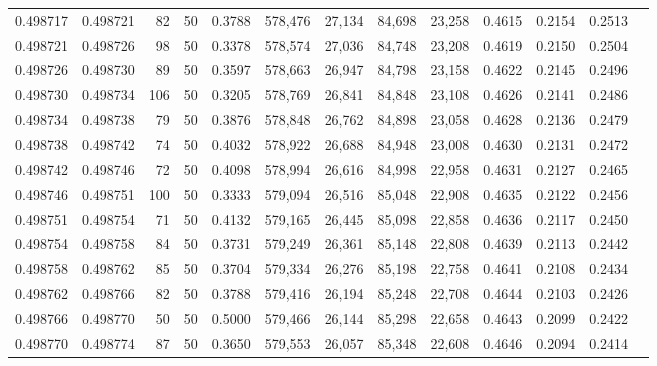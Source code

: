 \begin{tabular}{rrrrrrrrrrrrr}
0.498717 & 0.498721 &    82 &  50 &                                     0.3788 & 578,476 &  27,134 &  84,698 &  23,258 & 0.4615 & 0.2154 & 0.2513 \\
0.498721 & 0.498726 &    98 &  50 &                                     0.3378 & 578,574 &  27,036 &  84,748 &  23,208 & 0.4619 & 0.2150 & 0.2504 \\
0.498726 & 0.498730 &    89 &  50 &                                     0.3597 & 578,663 &  26,947 &  84,798 &  23,158 & 0.4622 & 0.2145 & 0.2496 \\
0.498730 & 0.498734 &   106 &  50 &                                     0.3205 & 578,769 &  26,841 &  84,848 &  23,108 & 0.4626 & 0.2141 & 0.2486 \\
0.498734 & 0.498738 &    79 &  50 &                                     0.3876 & 578,848 &  26,762 &  84,898 &  23,058 & 0.4628 & 0.2136 & 0.2479 \\
0.498738 & 0.498742 &    74 &  50 &                                     0.4032 & 578,922 &  26,688 &  84,948 &  23,008 & 0.4630 & 0.2131 & 0.2472 \\
0.498742 & 0.498746 &    72 &  50 &                                     0.4098 & 578,994 &  26,616 &  84,998 &  22,958 & 0.4631 & 0.2127 & 0.2465 \\
0.498746 & 0.498751 &   100 &  50 &                                     0.3333 & 579,094 &  26,516 &  85,048 &  22,908 & 0.4635 & 0.2122 & 0.2456 \\
0.498751 & 0.498754 &    71 &  50 &                                     0.4132 & 579,165 &  26,445 &  85,098 &  22,858 & 0.4636 & 0.2117 & 0.2450 \\
0.498754 & 0.498758 &    84 &  50 &                                     0.3731 & 579,249 &  26,361 &  85,148 &  22,808 & 0.4639 & 0.2113 & 0.2442 \\
0.498758 & 0.498762 &    85 &  50 &                                     0.3704 & 579,334 &  26,276 &  85,198 &  22,758 & 0.4641 & 0.2108 & 0.2434 \\
0.498762 & 0.498766 &    82 &  50 &                                     0.3788 & 579,416 &  26,194 &  85,248 &  22,708 & 0.4644 & 0.2103 & 0.2426 \\
0.498766 & 0.498770 &    50 &  50 &                                     0.5000 & 579,466 &  26,144 &  85,298 &  22,658 & 0.4643 & 0.2099 & 0.2422 \\
0.498770 & 0.498774 &    87 &  50 &                                     0.3650 & 579,553 &  26,057 &  85,348 &  22,608 & 0.4646 & 0.2094 & 0.2414 \\

\end{tabular}
